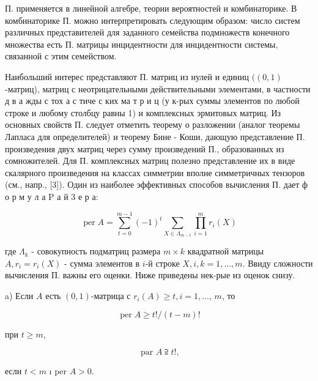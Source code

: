 \documentclass[10pt]{article}
\begin{document}
П. применяется в линейной алгебре, теории вероятностей и комбинаторике. В комбинаторике П. можно интерпретировать следующим образом: число систем различных представителей для заданного семейства подмножеств конечного множества есть П. матрицы инцидентности для инцидентности системы, связанной с этим семейством.



Наибольший интерес представляют П. матриц из нулей и единиц $((0,1)$-матриц), матриц с неотрицательными действительными элементами, в частности д в а жды с тох а с тиче с ких ма т р и ц (у к-рых суммы элементов по любой строке и любому столбцу равны 1) и комплексных эрмитовых матриц. Из основных свойств П. следует отметить теорему о разложении (аналог теоремы Лапласа для определителей) и теорему Бине - Коши, дающую представление П. произведения двух матриц через сумму произведений П., образованных из сомножителей. Для П. комплексных матриц полезно представление их в виде скалярного произведения на классах симметрии вполне симметричных тензоров (см., напр., [3]). Один из наиболее эффективных способов вычисления П. дает ф о р м у л а $\mathrm{P}$ а й 3 е р а:



\[

\operatorname{per} A=\sum_{t=0}^{m-1}(-1)^{t} \sum_{X \in \Lambda_{m-t}} \prod_{i=1}^{m} r_{i}(X)

\]



где $\Lambda_{k}$ - совокупность подматриц размера $m \times k$ квадратной матрицы $A, r_{i}=r_{i}(X)$ - сумма элементов в $i$-й строке $X, i, k=1, \ldots, m$. Ввиду сложности вычисления П. важны его оценки. Ниже приведены нек-рые из оценок снизу.



a) Если $A$ есть $(0,1)$-матрица с $r_{i}(A) \geqslant t, i=1, \ldots$, $m$, то



\[

\operatorname{per} A \geqslant t ! /(t-m) !

\]



при $t \geqslant m$,



\[

\text { par } A \supseteqq t !,

\]



если $t<m$ ı per $A>0$.
\end{document}
